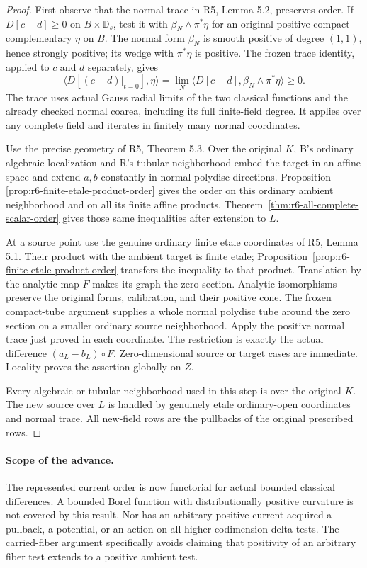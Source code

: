 \documentclass[11pt,a4paper]{article}
\numberwithin{equation}{section}
\theoremstyle{definition}
\theoremstyle{remark}
\begin{document}
\begin{proof}
First observe that the normal trace in R5, Lemma 5.2, preserves
order. If $D[c-d]\geq0$ on $B\times\mathbb D_s$, test it with
$\beta_N\wedge\pi^*\eta$ for an original positive compact
complementary $\eta$ on $B$. The normal form $\beta_N$ is smooth
positive of degree $(1,1)$, hence strongly positive; its wedge with
$\pi^*\eta$ is positive. The frozen trace identity, applied to
$c$ and $d$ separately, gives
\[
       \langle D[(c-d)|_{t=0}],\eta\rangle
          =\lim_N\langle D[c-d],\beta_N\wedge\pi^*\eta\rangle
          \geq0.
\]
The trace uses actual Gauss radial limits of the two classical
functions and the already checked normal coarea, including its full
finite-field degree. It applies over any complete field and iterates
in finitely many normal coordinates.

Use the precise geometry of R5, Theorem 5.3. Over the original $K$,
B's ordinary algebraic localization and R's tubular neighborhood
embed the target in an affine space and extend $a,b$ constantly
in normal polydisc directions. Proposition
\ref{prop:r6-finite-etale-product-order} gives the order on this
ordinary ambient neighborhood and on all its finite affine products.
Theorem~\ref{thm:r6-all-complete-scalar-order} gives those same
inequalities after extension to $L$.

At a source point use the genuine ordinary finite etale coordinates
of R5, Lemma 5.1. Their product with the ambient target is finite
etale; Proposition~\ref{prop:r6-finite-etale-product-order} transfers
the inequality to that product. Translation by the analytic map
$F$ makes its graph the zero section. Analytic isomorphisms preserve
the original forms, calibration, and their positive cone. The frozen
compact-tube argument supplies a whole normal polydisc tube around
the zero section on a smaller ordinary source neighborhood. Apply
the positive normal trace just proved in each coordinate. The
restriction is exactly the actual difference $(a_L-b_L)\circ F$.
Zero-dimensional source or target cases are immediate. Locality
proves the assertion globally on $Z$.

Every algebraic or tubular neighborhood used in this step is over
the original $K$. The new source over $L$ is handled by genuinely
etale ordinary-open coordinates and normal trace. All new-field
rows are the pullbacks of the original prescribed rows.
\end{proof}

\paragraph{Scope of the advance.}
The represented current order is now functorial for actual bounded
classical differences. A bounded Borel function with distributionally
positive curvature is not covered by this result. Nor has an arbitrary
positive current acquired a pullback, a potential, or an action on all
higher-codimension delta-tests. The carried-fiber argument specifically
avoids claiming that positivity of an arbitrary fiber test extends
to a positive ambient test.
\end{document}
